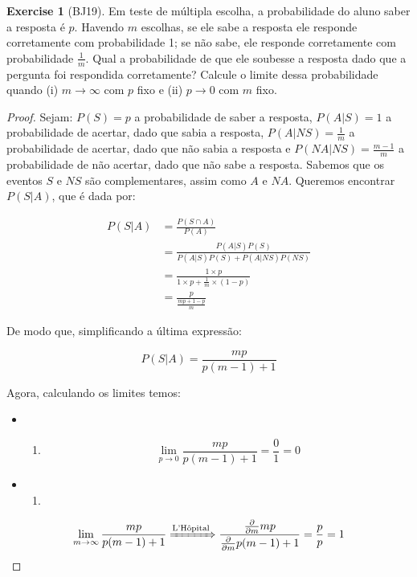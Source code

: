 \documentclass[
]{article}
\providecommand{\tightlist}{%
  \setlength{\itemsep}{0pt}\setlength{\parskip}{0pt}}
\theoremstyle{definition}
\theoremstyle{definition}
\theoremstyle{definition}
\newtheorem{exercise}{Exercise}[section]
\theoremstyle{definition}
\theoremstyle{remark}
\begin{document}
\begin{exercise}[BJ19]

Em teste de múltipla escolha, a probabilidade do aluno saber a resposta é \(p\). Havendo \(m\) escolhas, se ele sabe a resposta ele responde corretamente com probabilidade 1; se não sabe, ele responde corretamente com probabilidade \(\frac{1}{m}\). Qual a probabilidade de que ele soubesse a resposta dado que a pergunta foi respondida corretamente? Calcule o limite dessa probabilidade quando (i) \(m \to \infty\) com \(p\) fixo e (ii) \(p \to 0\) com \(m\) fixo.

\begin{proof}
Sejam: \(P(S) = p\) a probabilidade de saber a resposta, \(P(A|S) = 1\) a probabilidade de acertar, dado que sabia a resposta, \(P(A|NS) = \frac{1}{m}\) a probabilidade de acertar, dado que não sabia a resposta e \(P(NA|NS) = \frac{m-1}{m}\) a probabilidade de não acertar, dado que não sabe a resposta. Sabemos que os eventos \(S\) e \(NS\) são complementares, assim como \(A\) e \(NA\). Queremos encontrar \(P(S|A)\), que é dada por:

\begin{align*}
P(S|A) &= \frac{P(S \cap A)}{P(A)} \\
&= \frac{P(A|S) P(S)}{P(A|S)P(S) + P(A|NS)P(NS)} \\
&= \frac{1 \times p}{1 \times p + \frac{1}{m} \times (1-p)} \\
&= \frac{p}{\frac{mp + 1 - p}{m}}
\end{align*}

De modo que, simplificando a última expressão:

\begin{equation}
P(S|A) = \frac{mp}{p(m-1)+1}
\label{eq:pdesdadoa}
\end{equation}

Agora, calculando os limites temos:

\begin{itemize}
\item
  \begin{enumerate}
  \def\labelenumi{(\roman{enumi})}
  \tightlist
  \item
    \begin{equation*}
    \lim_{p \to 0} \frac{mp}{p(m-1)+1} = \frac{0}{1} = 0
    \end{equation*}
  \end{enumerate}
\item
  \begin{enumerate}
  \def\labelenumi{(\roman{enumi})}
  \setcounter{enumi}{1}
  \tightlist
  \item
  \end{enumerate}
\end{itemize}

\begin{equation*}
\lim_{m \to \infty} \frac{mp}{p(m-1)+1} \xRightarrow{\text{L'Hôpital}} \frac{\frac{\partial}{\partial m}mp}{\frac{\partial}{\partial m}p(m-1)+1} = \frac{p}{p} = 1
\end{equation*}
\end{proof}

\end{exercise}
\end{document}
